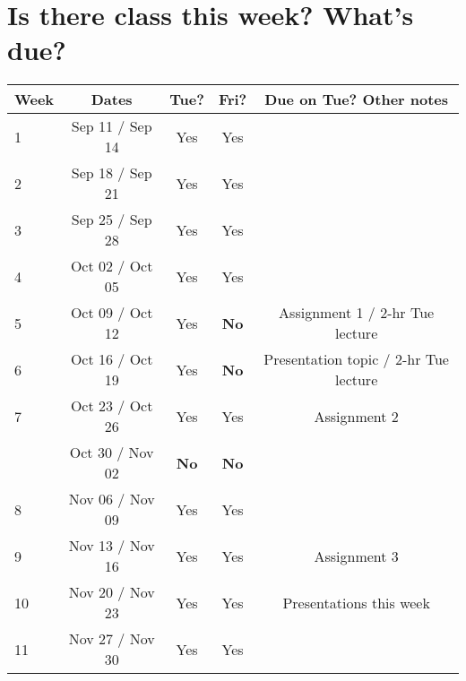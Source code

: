 \documentclass{article}
\begin{document}
\section*{Is there class this week? What's due?}

\begin{table}[H]
\begin{center}
\begin{tabular}{lcccc}
Week & Dates &  \quad Tue? \quad & \quad Fri? \quad & \quad Due on Tue? Other notes\\
\hline
\hline
1 & Sep 11 / Sep 14 & Yes & Yes & \\ %
2 & Sep 18 / Sep 21 & Yes & Yes & \\ %
3 & Sep 25 / Sep 28 & Yes & Yes & \\ %
4 & Oct 02 / Oct 05 & Yes & Yes & \\ %
5 & Oct 09 / Oct 12 & Yes & {\bf No} & Assignment 1 / 2-hr Tue lecture \\ %
6 & Oct 16 / Oct 19 & Yes & {\bf No} & Presentation topic  / 2-hr Tue lecture \\ %
7 & Oct 23 / Oct 26 & Yes & Yes & Assignment 2 \\ %
 & Oct 30 / Nov 02 & {\bf No} & {\bf No} & \\ 
8 & Nov 06 / Nov 09 & Yes & Yes & \\ %
9 & Nov 13 / Nov 16 & Yes & Yes &  Assignment 3 \\ %
10 & Nov 20 / Nov 23 & Yes & Yes & Presentations this week\\ 
11 & Nov 27 / Nov 30 & Yes & Yes %
\end{tabular}
\end{center}
\end{table}
\end{document}
